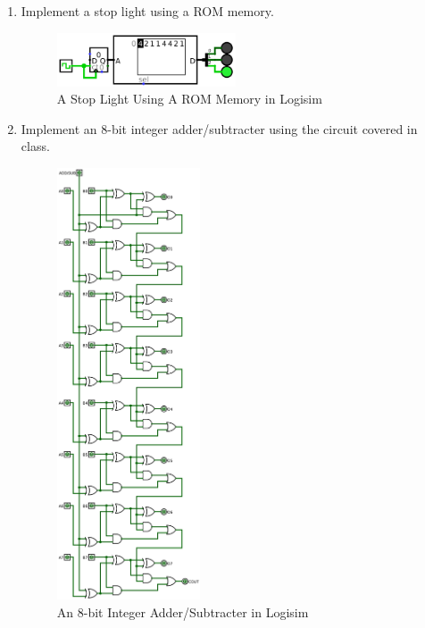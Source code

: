 \documentclass[12pt]{article}
\begin{document}
\begin{enumerate}
    \item Implement a stop light using a ROM memory.
    \begin{figure}[h]
      \centering
      \includegraphics[width=0.5\textwidth]{assn/03/media/04.png}
      \caption{A Stop Light Using A ROM Memory in Logisim}
    \end{figure}

    \item Implement an 8-bit integer adder/subtracter using the circuit covered in class. 
    \begin{figure}[h]
      \centering
      \includegraphics[width=0.4\textwidth]{assn/03/media/05.png}
      \caption{An 8-bit Integer Adder/Subtracter in Logisim}
    \end{figure}

  \end{enumerate}
\end{document}
